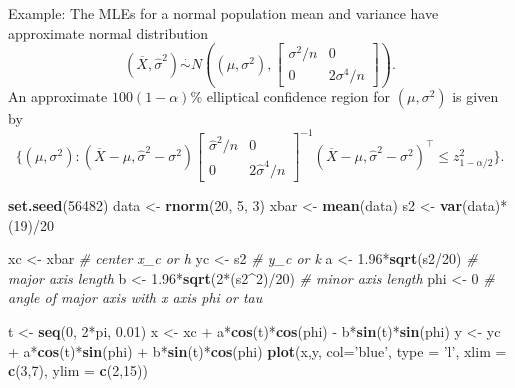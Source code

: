 \documentclass[]{book}
\newenvironment{Shaded}{\begin{snugshade}}{\end{snugshade}}
\newcommand{\KeywordTok}[1]{\textcolor[rgb]{0.13,0.29,0.53}{\textbf{{#1}}}}
\newcommand{\DataTypeTok}[1]{\textcolor[rgb]{0.13,0.29,0.53}{{#1}}}
\newcommand{\DecValTok}[1]{\textcolor[rgb]{0.00,0.00,0.81}{{#1}}}
\newcommand{\FloatTok}[1]{\textcolor[rgb]{0.00,0.00,0.81}{{#1}}}
\newcommand{\StringTok}[1]{\textcolor[rgb]{0.31,0.60,0.02}{{#1}}}
\newcommand{\CommentTok}[1]{\textcolor[rgb]{0.56,0.35,0.01}{\textit{{#1}}}}
\newcommand{\NormalTok}[1]{{#1}}
\begin{document}
Example: The MLEs for a normal population mean and variance have
approximate normal distribution
\[(\overline X, \hat\sigma^2) \stackrel{\cdot}{\sim}N\left((\mu, \sigma^2), \begin{bmatrix} \sigma^2/n & 0 \\ 0 & 2\sigma^4/n \end{bmatrix}\right).\]
An approximate \(100(1-\alpha)\%\) elliptical confidence region for
\((\mu, \sigma^2)\) is given by
\[\{(\mu, \sigma^2): (\overline X - \mu, \hat\sigma^2 - \sigma^2)\begin{bmatrix} \hat\sigma^2/n & 0 \\ 0 & 2\hat\sigma^4/n \end{bmatrix}^{-1} (\overline X - \mu, \hat\sigma^2 - \sigma^2)^\top \leq z_{1-\alpha/2}^2\}.\]

\begin{Shaded}
\begin{Highlighting}[]
\KeywordTok{set.seed}\NormalTok{(}\DecValTok{56482}\NormalTok{)}
\NormalTok{data <-}\StringTok{ }\KeywordTok{rnorm}\NormalTok{(}\DecValTok{20}\NormalTok{, }\DecValTok{5}\NormalTok{, }\DecValTok{3}\NormalTok{)}
\NormalTok{xbar <-}\StringTok{ }\KeywordTok{mean}\NormalTok{(data)}
\NormalTok{s2 <-}\StringTok{ }\KeywordTok{var}\NormalTok{(data)*(}\DecValTok{19}\NormalTok{)/}\DecValTok{20}

\NormalTok{xc <-}\StringTok{ }\NormalTok{xbar }\CommentTok{# center x_c or h}
\NormalTok{yc <-}\StringTok{ }\NormalTok{s2 }\CommentTok{# y_c or k}
\NormalTok{a <-}\StringTok{ }\FloatTok{1.96}\NormalTok{*}\KeywordTok{sqrt}\NormalTok{(s2/}\DecValTok{20}\NormalTok{) }\CommentTok{# major axis length}
\NormalTok{b <-}\StringTok{  }\FloatTok{1.96}\NormalTok{*}\KeywordTok{sqrt}\NormalTok{(}\DecValTok{2}\NormalTok{*(s2^}\DecValTok{2}\NormalTok{)/}\DecValTok{20}\NormalTok{) }\CommentTok{# minor axis length}
\NormalTok{phi <-}\StringTok{ }\DecValTok{0} \CommentTok{# angle of major axis with x axis phi or tau}

\NormalTok{t <-}\StringTok{ }\KeywordTok{seq}\NormalTok{(}\DecValTok{0}\NormalTok{, }\DecValTok{2}\NormalTok{*pi, }\FloatTok{0.01}\NormalTok{) }
\NormalTok{x <-}\StringTok{ }\NormalTok{xc +}\StringTok{ }\NormalTok{a*}\KeywordTok{cos}\NormalTok{(t)*}\KeywordTok{cos}\NormalTok{(phi) -}\StringTok{ }\NormalTok{b*}\KeywordTok{sin}\NormalTok{(t)*}\KeywordTok{sin}\NormalTok{(phi)}
\NormalTok{y <-}\StringTok{ }\NormalTok{yc +}\StringTok{ }\NormalTok{a*}\KeywordTok{cos}\NormalTok{(t)*}\KeywordTok{sin}\NormalTok{(phi) +}\StringTok{ }\NormalTok{b*}\KeywordTok{sin}\NormalTok{(t)*}\KeywordTok{cos}\NormalTok{(phi)}
\KeywordTok{plot}\NormalTok{(x,y, }\DataTypeTok{col=}\StringTok{'blue'}\NormalTok{,  }\DataTypeTok{type =} \StringTok{'l'}\NormalTok{, }\DataTypeTok{xlim =} \KeywordTok{c}\NormalTok{(}\DecValTok{3}\NormalTok{,}\DecValTok{7}\NormalTok{), }\DataTypeTok{ylim =} \KeywordTok{c}\NormalTok{(}\DecValTok{2}\NormalTok{,}\DecValTok{15}\NormalTok{))}


\end{Highlighting}
\end{Shaded}
\end{document}
